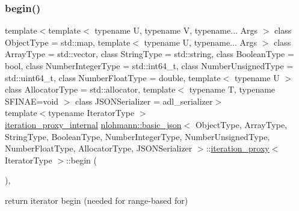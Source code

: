 \subsubsection{\texorpdfstring{begin()}{begin()}}
{\footnotesize\ttfamily template$<$template$<$ typename U, typename V, typename... Args $>$ class Object\+Type = std\+::map, template$<$ typename U, typename... Args $>$ class Array\+Type = std\+::vector, class String\+Type  = std\+::string, class Boolean\+Type  = bool, class Number\+Integer\+Type  = std\+::int64\+\_\+t, class Number\+Unsigned\+Type  = std\+::uint64\+\_\+t, class Number\+Float\+Type  = double, template$<$ typename U $>$ class Allocator\+Type = std\+::allocator, template$<$ typename T, typename S\+F\+I\+N\+A\+E=void $>$ class J\+S\+O\+N\+Serializer = adl\+\_\+serializer$>$ \\
template$<$typename Iterator\+Type $>$ \\
\hyperlink{classnlohmann_1_1basic__json_1_1iteration__proxy_1_1iteration__proxy__internal}{iteration\+\_\+proxy\+\_\+internal} \hyperlink{classnlohmann_1_1basic__json}{nlohmann\+::basic\+\_\+json}$<$ Object\+Type, Array\+Type, String\+Type, Boolean\+Type, Number\+Integer\+Type, Number\+Unsigned\+Type, Number\+Float\+Type, Allocator\+Type, J\+S\+O\+N\+Serializer $>$\+::\hyperlink{classnlohmann_1_1basic__json_1_1iteration__proxy}{iteration\+\_\+proxy}$<$ Iterator\+Type $>$\+::begin (\begin{DoxyParamCaption}{ }\end{DoxyParamCaption})\hspace{0.3cm}{\ttfamily [inline]}, {\ttfamily [noexcept]}}



return iterator begin (needed for range-\/based for) 

\mbox{\label{classnlohmann_1_1basic__json_1_1iteration__proxy_a96373fd95d730d50c78974cf7fa8c3a8}} 
